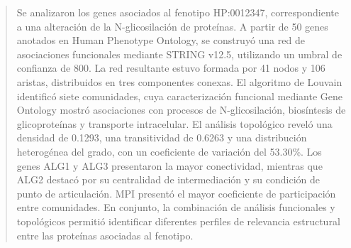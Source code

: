 \documentclass{bmcart}
\begin{document}
\begin{frontmatter}
\begin{abstractbox}
\begin{abstract}
			 Se analizaron los genes asociados al fenotipo HP:0012347, correspondiente a una alteración de la N-glicosilación de proteínas.
             A partir de 50 genes anotados en Human Phenotype Ontology, se construyó una red de asociaciones funcionales mediante STRING v12.5, utilizando un umbral de confianza de 800. La red resultante estuvo formada por 41 nodos y 106 aristas,
             distribuidos en tres componentes conexas. El algoritmo de Louvain identificó siete comunidades, cuya caracterización funcional mediante Gene Ontology mostró asociaciones con procesos de N-glicosilación, biosíntesis de glicoproteínas y transporte intracelular.
			 El análisis topológico reveló una densidad de 0.1293, una transitividad de 0.6263 y una distribución heterogénea del grado, con un coeficiente de variación del 53.30\%.
			 Los genes ALG1 y ALG3 presentaron la mayor
			 conectividad, mientras que ALG2 destacó por su
			 centralidad de intermediación y su condición
			 de punto de articulación. MPI presentó el
			 mayor coeficiente de participación entre comunidades.
			 En conjunto, la combinación de análisis funcionales y topológicos permitió identificar diferentes
			 perfiles de relevancia estructural entre las proteínas asociadas al fenotipo.

			\end{abstract}
			\begin{keyword}
			\end{keyword}
		\end{abstractbox}
	
	\end{frontmatter}
	
	
	
	
	
	
	
	
	
	
\end{document}
